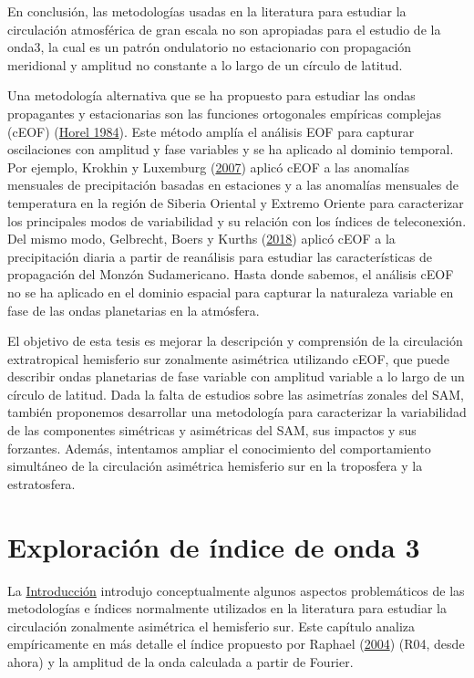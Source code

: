 \documentclass[12pt,oneside,a4paper]{reedthesis}
\begin{document}
En conclusión, las metodologías usadas en la literatura para estudiar la circulación atmosférica de gran escala no son apropiadas para el estudio de la onda3, la cual es un patrón ondulatorio no estacionario con propagación meridional y amplitud no constante a lo largo de un círculo de latitud.

Una metodología alternativa que se ha propuesto para estudiar las ondas propagantes y estacionarias son las funciones ortogonales empíricas complejas (cEOF) (\protect\hyperlink{ref-horel1984}{Horel 1984}).
Este método amplía el análisis EOF para capturar oscilaciones con amplitud y fase variables y se ha aplicado al dominio temporal.
Por ejemplo, Krokhin y Luxemburg (\protect\hyperlink{ref-krokhin2007}{2007}) aplicó cEOF a las anomalías mensuales de precipitación basadas en estaciones y a las anomalías mensuales de temperatura en la región de Siberia Oriental y Extremo Oriente para caracterizar los principales modos de variabilidad y su relación con los índices de teleconexión.
Del mismo modo, Gelbrecht, Boers y Kurths (\protect\hyperlink{ref-gelbrecht2018}{2018}) aplicó cEOF a la precipitación diaria a partir de reanálisis para estudiar las características de propagación del Monzón Sudamericano.
Hasta donde sabemos, el análisis cEOF no se ha aplicado en el dominio espacial para capturar la naturaleza variable en fase de las ondas planetarias en la atmósfera.

El objetivo de esta tesis es mejorar la descripción y comprensión de la circulación extratropical hemisferio sur zonalmente asimétrica utilizando cEOF, que puede describir ondas planetarias de fase variable con amplitud variable a lo largo de un círculo de latitud.
Dada la falta de estudios sobre las asimetrías zonales del SAM, también proponemos desarrollar una metodología para caracterizar la variabilidad de las componentes simétricas y asimétricas del SAM, sus impactos y sus forzantes.
Además, intentamos ampliar el conocimiento del comportamiento simultáneo de la circulación asimétrica hemisferio sur en la troposfera y la estratosfera.

\hypertarget{exploraciuxf3n-de-uxedndice-de-onda-3}{%
\chapter{Exploración de índice de onda 3}\label{exploraciuxf3n-de-uxedndice-de-onda-3}}

La \protect\hyperlink{intro}{Introducción} introdujo conceptualmente algunos aspectos problemáticos de las metodologías e índices normalmente utilizados en la literatura para estudiar la circulación zonalmente asimétrica el hemisferio sur.
Este capítulo analiza empíricamente en más detalle el índice propuesto por Raphael (\protect\hyperlink{ref-raphael2004}{2004}) (R04, desde ahora) y la amplitud de la onda calculada a partir de Fourier.
\end{document}
